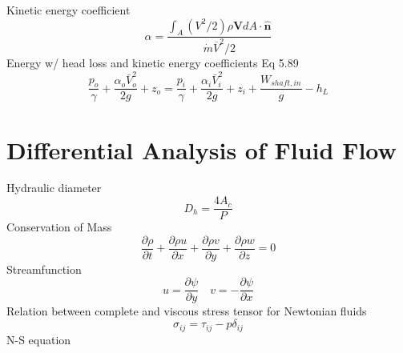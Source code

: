 \documentclass{article}
\begin{document}
\newline
\newline
Kinetic energy coefficient
\begin{equation}
  \alpha = \frac{\int_A (V^2/2) \rho \mathbf{V}dA \cdot \mathbf{\hat{n}}}{\dot{m} \overline{V}^2/2}
\end{equation}
\newline
\newline
Energy w/ head loss and kinetic energy coefficients Eq 5.89
\begin{equation}
    \frac{p_o}{\gamma} + \frac{\alpha_o\bar{V}^2_o}{2g}+z_o = \frac{p_i}{\gamma} + \frac{\alpha_i\bar{V}^2_i}{2g}+z_i + \frac{W_{shaft,in}}{g} - h_L
\end{equation}

%
%
\newpage
\section{Differential Analysis of Fluid Flow}

Hydraulic diameter
\begin{equation}
  D_h = \frac{4A_c}{P}
\end{equation}
\newline
\newline
Conservation of Mass
\begin{equation}
  \frac{\partial\rho}{\partial t} + \frac{\partial\rho u}{\partial x} +\frac{\partial\rho v}{\partial y} +\frac{\partial\rho w}{\partial z} = 0
\end{equation}
\newline
\newline
Streamfunction
\begin{equation}
  u=\frac{\partial\psi}{\partial y}\quad v=-\frac{\partial\psi}{\partial x}
\end{equation}
\newline
\newline
Relation between complete and viscous stress tensor for Newtonian fluids
\begin{equation}
  \sigma_{ij} = \tau_{ij} - p \delta_{ij}
\end{equation}
\newline
\newline
N-S equation
\end{document}
